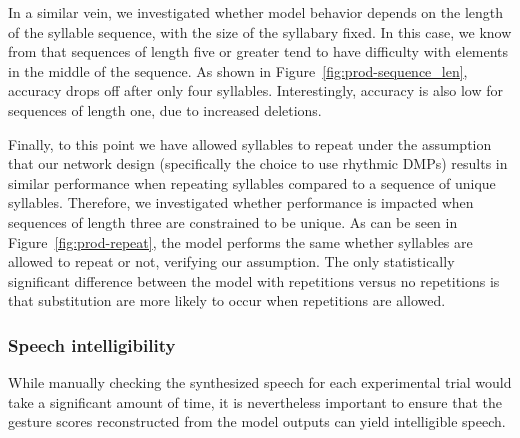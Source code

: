 In a similar vein,
we investigated whether model behavior
depends on the length of the syllable sequence,
with the size of the syllabary fixed.
In this case, we know from \citet{choo2010}
that sequences of length five or greater
tend to have difficulty with elements
in the middle of the sequence.
As shown in Figure~\ref{fig:prod-sequence_len},
accuracy drops off after only four syllables.
Interestingly, accuracy is also low
for sequences of length one,
due to increased deletions.


Finally, to this point we have
allowed syllables to repeat
under the assumption that our network design
(specifically the choice to use rhythmic DMPs)
results in similar performance when
repeating syllables compared to
a sequence of unique syllables.
Therefore, we investigated whether
performance is impacted when
sequences of length three
are constrained to be unique.
As can be seen in Figure~\ref{fig:prod-repeat},
the model performs the same
whether syllables are allowed to repeat or not,
verifying our assumption.
The only statistically significant difference
between the model with repetitions
versus no repetitions
is that substitution are more likely
to occur when repetitions are allowed.

\subsubsection{Speech intelligibility}

While manually checking the synthesized speech
for each experimental trial
would take a significant amount of time,
it is nevertheless important
to ensure that the gesture scores
reconstructed from the model outputs
can yield intelligible speech.


